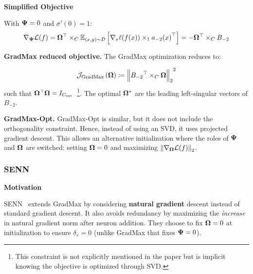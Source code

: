 \noindent\textbf{Simplified Objective}

\begin{lemma}

With \(\boldsymbol{\Psi}{} = 0\) and \(\sigma'(0) = 1\):
\[\nabla_{\boldsymbol{\Psi}{}}\mathcal{L}(f) = \boldsymbol{\Omega}{}^{\top} \times_{C}\mathbb{E}_{(x,y) \sim \mathcal{D}}\left\lbrack {\nabla_{s_{}}\ell(f(x))} \times_{1}{a_{- 2}(x)}^{\top} \right\rbrack = - \boldsymbol{\Omega}{}^{\top} \times_{C}B_{- 2}\]

\end{lemma}

\begin{proposition}\label{prop:gradmax_reduced}

\textbf{GradMax reduced objective.} The GradMax optimization reduces to:

\begin{equation}\label{eq:gradmax_reduced}
\mathcal{J}_{\text{GradMax}}\left( \boldsymbol{\Omega}{} \right) \coloneqq {\left\| {{B_{- 2}}^{\top} \times_{C}\boldsymbol{\Omega}{}} \right\|_{2}}^{2}
\end{equation}
such that \(\boldsymbol{\Omega}{}^{\top}\boldsymbol{\Omega}{} = I_{C_{\text{ext}}}\)~\footnote{This constraint is not explicitly mentioned in the paper but is implicit knowing the objective is optimized through SVD.}. The optimal \(\boldsymbol{\Omega}{}^{\ast}\) are the leading left-singular vectors
of \(B_{- 2}\).

\end{proposition}

\noindent\textbf{GradMax-Opt.} GradMax-Opt is similar, but it does not include the orthogonality constraint. Hence, instead of using an SVD, it uses projected gradient descent. This allows an alternative initialization where the roles of \(\boldsymbol{\Psi}{}\) and \(\boldsymbol{\Omega}{}\) are switched: setting \(\boldsymbol{\Omega}{} = 0\) and maximizing \(\left\| {\nabla_{\boldsymbol{\Omega}{}}\mathcal{L}(f)} \right\|_{2}\).

\subsubsection{SENN}\label{sec:senn}

\textbf{Motivation}

SENN~\citep{mitchell_self-expanding_2024} extends GradMax
by considering \textbf{natural gradient} descent instead of standard
gradient descent. It also avoids redundancy by maximizing the
\emph{increase} in natural gradient norm after neuron addition. They
choose to fix \(\boldsymbol{\Omega}{} = 0\) at initialization to ensure
\(\delta_{s_{}} = 0\) (unlike GradMax that fixes \(\boldsymbol{\Psi}{} = 0\)).

